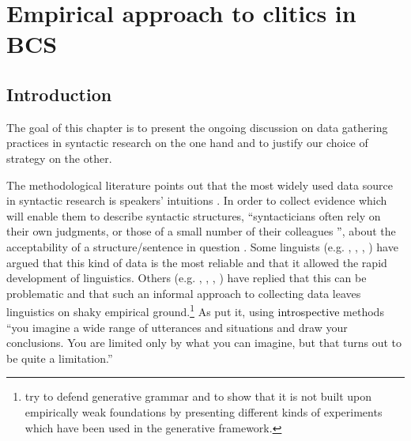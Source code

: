\chapter{Empirical approach to clitics in BCS}
\label{Empirical approach to clitics in BCS}

\section{Introduction}
\label{Introduction:4}
The goal of this chapter is to present the ongoing discussion on data gathering practices in syntactic research on the one hand and to justify our choice of strategy on the other.

The methodological literature points out that the most widely used data source in syntactic research is speakers’ intuitions \textcolor{black}{\citep[27]{SchutzeSprouse13}}. In order to collect evidence which will enable them to describe syntactic structures, \textcolor{black}{``}syntacticians often rely on their own judgments, or those of a small number of their colleagues \textcolor{black}{''}, about the acceptability of a structure/sentence in question \citep[1]{Dabrowska10}. Some linguists (e.g. \citealt[48ff]{Newmeyer83}, \citealt[353]{Fanselow07}, \citealt[370]{Grewendorf07}, \citealt{Phillips10}) have argued that this kind of data is the most reliable and that it allowed the rapid development of linguistics. Others (e.g. \citealt{Schutze16}, \citealt{Cowart97}, \citealt{Keller00}, \citealt{Featherston07}) have replied that this can be problematic and that such an informal approach to collecting data leaves linguistics on shaky empirical ground.\footnote{\citet{PhillipsLasnik03} try to defend generative grammar and to show that it is not built upon empirically weak foundations by presenting different kinds of experiments which have been used in the generative framework.} As  \citet[25]{ClarkBangerter04} put it, using \textcolor{black}{introspective} methods ``you imagine a wide range of utterances and situations and draw your conclusions. You are limited only by what you can imagine, but that turns out to be quite a limitation.''

